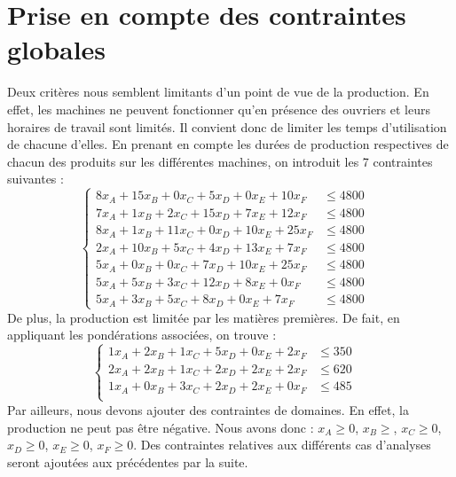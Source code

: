 \documentclass[12pt]{article}
\begin{document}
\section{Prise en compte des contraintes globales}
\label{globconst}
Deux critères nous semblent limitants d'un point de vue de la production. En effet, les machines ne peuvent fonctionner qu'en présence des ouvriers et leurs horaires de travail sont limités. Il convient donc de limiter les temps d'utilisation de chacune d'elles.
En prenant en compte les durées de production respectives de chacun des produits sur les différentes machines, on introduit les 7 contraintes suivantes :
\begin{equation*}
\left\{
\begin{aligned}
    8x_{A} + 15x_{B} + 0x_{C} + 5x_{D} + 0x_{E} + 10x_{F} &\leq 4800
    \quad\\
      7x_{A} + 1x_{B} + 2x_{C} + 15x_{D} + 7x_{E} + 12x_{F} &\leq 4800 \\
      8x_{A} + 1x_{B} + 11x_{C} + 0x_{D} + 10x_{E} + 25x_{F} &\leq 4800 \\
      2x_{A} + 10x_{B} + 5x_{C} + 4x_{D} + 13x_{E} + 7x_{F} &\leq 4800 \\
      5x_{A} + 0x_{B} + 0x_{C} + 7x_{D} + 10x_{E} + 25x_{F} &\leq 4800 \\
      5x_{A} + 5x_{B} + 3x_{C} + 12x_{D} + 8x_{E} + 0x_{F} &\leq 4800 \\
      5x_{A} + 3x_{B} + 5x_{C} + 8x_{D} + 0x_{E} + 7x_{F} &\leq 4800 
\end{aligned}
\right.
\end{equation*}
De plus, la production est limitée par les matières premières. De fait, en appliquant les pondérations associées, on trouve :
\begin{equation*}
\left\{
\begin{aligned}
         1x_{A} + 2x_{B} + 1x_{C} + 5x_{D} + 0x_{E} + 2x_{F} &\leq 350 \quad\\
      2x_{A} + 2x_{B} + 1x_{C} + 2x_{D} + 2x_{E} + 2x_{F} &\leq 620 \\
      1x_{A} + 0x_{B} + 3x_{C} + 2x_{D} + 2x_{E} + 0x_{F} &\leq 485 \\
\end{aligned}
\right.
\end{equation*}
Par ailleurs, nous devons ajouter des contraintes de domaines. En effet, la production ne peut pas être négative. Nous avons donc :
\(x_{A} \geq 0\), \(x_{B} \geq\), \(x_{C} \geq 0\), \(x_{D} \geq 0\), \(x_{E} \geq 0\), \(x_{F} \geq 0 \).
Des contraintes relatives aux différents cas d'analyses seront ajoutées aux précédentes par la suite.
\end{document}
